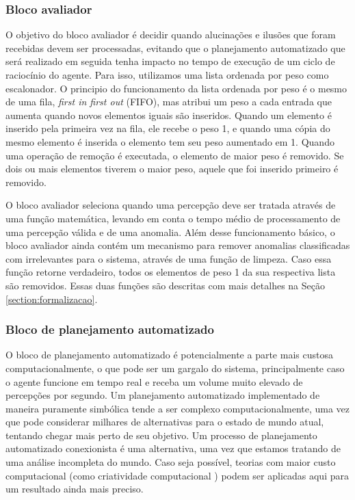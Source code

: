 \subsubsection{Bloco avaliador}

O objetivo do bloco avaliador é decidir quando alucinações e ilusões que foram recebidas devem ser processadas, evitando que o planejamento automatizado que será realizado em seguida tenha impacto no tempo de execução de um ciclo de raciocínio do agente. Para isso, utilizamos uma lista ordenada por peso como escalonador. O principio do funcionamento da lista ordenada por peso é o mesmo de uma fila, \textit{first in first out} (FIFO), mas atribui um peso a cada entrada que aumenta quando novos elementos iguais são inseridos. Quando um elemento é inserido pela primeira vez na fila, ele recebe o peso 1, e quando uma cópia do mesmo elemento é inserida o elemento tem seu peso aumentado em 1. Quando uma operação de remoção é executada, o elemento de maior peso é removido. Se dois ou mais elementos tiverem o maior peso, aquele que foi inserido primeiro é removido.

O bloco avaliador seleciona quando uma percepção deve ser tratada através de uma função matemática, levando em conta o tempo médio de processamento de uma percepção válida e de uma anomalia. Além desse funcionamento básico, o bloco avaliador ainda contém um mecanismo para remover anomalias classificadas com irrelevantes para o sistema, através de uma função de limpeza. Caso essa função retorne verdadeiro, todos os elementos de peso 1 da sua respectiva lista são removidos. Essas duas funções são descritas com mais detalhes na Seção \ref{section:formalizacao}.

\subsubsection{Bloco de planejamento automatizado}

O bloco de planejamento automatizado é potencialmente a parte mais custosa computacionalmente, o que pode ser um gargalo do sistema, principalmente caso o agente funcione em tempo real e receba um volume muito elevado de percepções por segundo. Um planejamento automatizado implementado de maneira puramente simbólica tende a ser complexo computacionalmente, uma vez que pode considerar milhares de alternativas para o estado de mundo atual, tentando chegar mais perto de seu objetivo. Um processo de planejamento automatizado conexionista é uma alternativa, uma vez que estamos tratando de uma análise incompleta do mundo. Caso seja possível, teorias com maior custo computacional (como criatividade computacional \cite{colton2012computational}) podem ser aplicadas aqui para um resultado ainda mais preciso.

